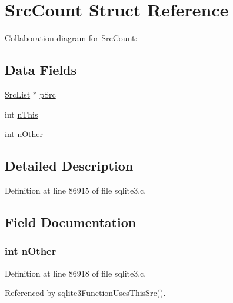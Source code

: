 \hypertarget{struct_src_count}{}\section{Src\+Count Struct Reference}
\label{struct_src_count}


Collaboration diagram for Src\+Count\+:
\subsection*{Data Fields}
\begin{DoxyCompactItemize}
\item 
\hyperlink{struct_src_list}{Src\+List} $\ast$ \hyperlink{struct_src_count_a84a7e06ff4c94a96573b33b55a0e23cf}{p\+Src}
\item 
int \hyperlink{struct_src_count_aa62d35615abd8d5434da7ba666ec913d}{n\+This}
\item 
int \hyperlink{struct_src_count_a10dcd206e941907977d225b9ce21a93a}{n\+Other}
\end{DoxyCompactItemize}


\subsection{Detailed Description}


Definition at line 86915 of file sqlite3.\+c.



\subsection{Field Documentation}
\hypertarget{struct_src_count_a10dcd206e941907977d225b9ce21a93a}{}
\subsubsection[{n\+Other}]{\setlength{\rightskip}{0pt plus 5cm}int n\+Other}\label{struct_src_count_a10dcd206e941907977d225b9ce21a93a}


Definition at line 86918 of file sqlite3.\+c.



Referenced by sqlite3\+Function\+Uses\+This\+Src().

\hypertarget{struct_src_count_aa62d35615abd8d5434da7ba666ec913d}{}

